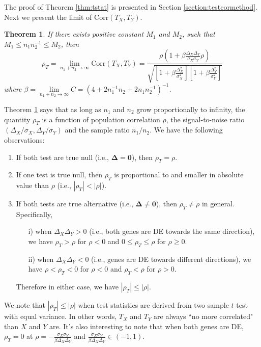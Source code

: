 \documentclass[12pt, a4paper]{article}
\newtheorem{theorem}{Theorem}       %
\newcommand{\cor}{\text{Corr}}
\begin{document}
	The proof of Theorem \ref{thm:tstat} is presented in Section \ref{section:testcormethod}. Next we present the limit of $\cor(T_X, T_Y)$.
	\begin{theorem}\label{thm:rholimit}
	  	If there exists positive constant $M_1$ and $M_2$, such that $M_1 \leq n_1n_2^{-1}\leq M_2$, then
	   \begin{equation}\label{eq:limitT}
	   \rho_T=\lim\limits_{n_1 + n_2 \rightarrow \infty} \cor(T_X, T_Y) = \frac{\rho(1  +
	   	\beta\frac{\Delta_X\Delta_Y}{\sigma_X\sigma_Y}\rho)}{\sqrt{  \left[ 1 +\beta\frac{\Delta_X^2}{\sigma_X^2}\right]\left[ 1 + \beta\frac{\Delta_Y^2}{\sigma_Y^2}\right]}}
	   \end{equation}
	   where %
	   $\beta = \lim\limits_{n_1 + n_2 \rightarrow \infty}C = (4 + 2n_1^{-1}n_2 + 2n_1n_2^{-1})^{-1}$.
	\end{theorem}
	Theorem \ref{thm:rholimit} says that as long as $n_1$ and $n_2$ grow proportionally to infinity, the quantity $\rho_T$ is a function of population correlation $\rho$, the signal-to-noise ratio $(\Delta_X/\sigma_X, \Delta_Y/\sigma_Y)$  and the sample ratio $n_1/n_2$. We have the following observations:
	\begin{enumerate}
		\item If both test are true null (i.e., $\bm \Delta = \bm 0$), then $\rho_T = \rho$.
		\item If one test is true null, then $\rho_T$ is proportional to and smaller in absolute value than $\rho$ (i.e., $|\rho_T|< |\rho|$).
		\item If both tests are true alternative (i.e., $\bm \Delta \neq \bm 0$), then $\rho_T\neq \rho$ in general. Specifically,
			\begin{enumerate}
				\item[i)]  when $\Delta_X\Delta_Y >0$ (i.e., both genes are DE towards the same direction), we have $\rho_T>\rho$ for $\rho <0$ and $0 \leq \rho_T \leq\rho$ for $\rho \geq 0$.
				\item[ii)] when $\Delta_X\Delta_Y <0$ (i.e., genes are DE towards different directions), we have
				$\rho <\rho_T<0$ for $\rho <0$ and $\rho_T<\rho$ for $\rho>0$.
			\end{enumerate}
		Therefore in either case, we have $|\rho_T| \leq |\rho|$. 
		\end{enumerate}
		
	We note that $|\rho_T| \leq |\rho|$ when test statistics are derived from two sample $t$ test with equal variance. In other words, $T_X$ and $T_Y$ are always ``no more correlated" than $X$ and $Y$ are. It's also interesting to note that when both genes are DE, $\rho_T=0$ at $\rho =-\frac{\sigma_X\sigma_Y}{\beta\Delta_X\Delta_Y} $ and $\frac{\sigma_X\sigma_Y}{\beta\Delta_X\Delta_Y} \in (-1, 1)$.
			
\end{document}
